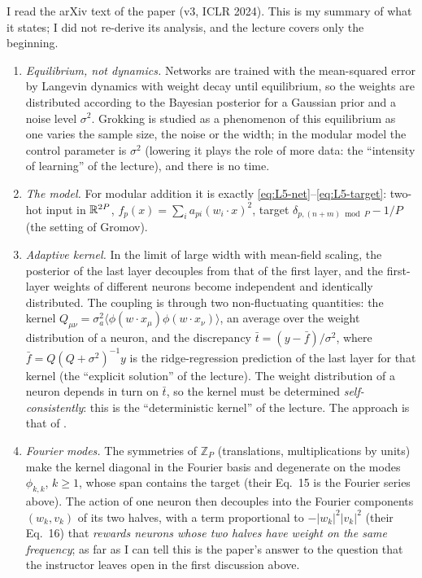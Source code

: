 \begin{beyond}
I read the arXiv text of the paper (v3, ICLR 2024). This is my summary of what it states; I did not re-derive its analysis, and the lecture covers only the beginning.
\begin{enumerate}[label=(\roman*), itemsep=0.1em, topsep=0.2em]
  \item \emph{Equilibrium, not dynamics.} Networks are trained with the mean-squared error by Langevin dynamics with weight decay until equilibrium, so the weights are distributed according to the Bayesian posterior for a Gaussian prior and a noise level $\sigma^2$. Grokking is studied as a phenomenon of this equilibrium as one varies the sample size, the noise or the width; in the modular model the control parameter is $\sigma^2$ (lowering it plays the role of more data: the ``intensity of learning'' of the lecture), and there is no time.
  \item \emph{The model.} For modular addition it is exactly \eqref{eq:L5-net}--\eqref{eq:L5-target}: two-hot input in $\mathbb{R}^{2P}$, $f_p(x)=\sum_ia_{pi}(w_i\!\cdot\!x)^2$, target $\delta_{p,(n+m)\bmod P}-1/P$ (the setting of Gromov).
  \item \emph{Adaptive kernel.} In the limit of large width with mean-field scaling, the posterior of the last layer decouples from that of the first layer, and the first-layer weights of different neurons become independent and identically distributed. The coupling is through two non-fluctuating quantities: the kernel $Q_{\mu\nu}=\sigma_a^2\langle\phi(w\!\cdot\!x_\mu)\phi(w\!\cdot\!x_\nu)\rangle$, an average over the weight distribution of a neuron, and the discrepancy $\bar t=(y-\bar f)/\sigma^2$, where $\bar f=Q(Q+\sigma^2)^{-1}y$ is the ridge-regression prediction of the last layer for that kernel (the ``explicit solution'' of the lecture). The weight distribution of a neuron depends in turn on $\bar t$, so the kernel must be determined \emph{self-consistently}: this is the ``deterministic kernel'' of the lecture. The approach is that of \citet{seroussi2023}.
  \item \emph{Fourier modes.} The symmetries of $\mathbb Z_P$ (translations, multiplications by units) make the kernel diagonal in the Fourier basis and degenerate on the modes $\phi_{k,k}$, $k\ge1$, whose span contains the target (their Eq.~15 is the Fourier series above). The action of one neuron then decouples into the Fourier components $(w_k,v_k)$ of its two halves, with a term proportional to $-|w_k|^2|v_k|^2$ (their Eq.~16) that \emph{rewards neurons whose two halves have weight on the same frequency}; as far as I can tell this is the paper's answer to the question that the instructor leaves open in the first discussion above.

\end{enumerate}
\end{beyond}
